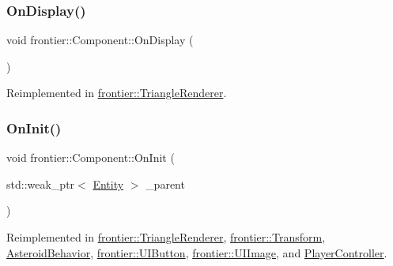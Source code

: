\subsubsection{\texorpdfstring{On\+Display()}{OnDisplay()}}
{\footnotesize\ttfamily void frontier\+::\+Component\+::\+On\+Display (\begin{DoxyParamCaption}{ }\end{DoxyParamCaption})\hspace{0.3cm}{\ttfamily [virtual]}}



Reimplemented in \hyperlink{classfrontier_1_1_triangle_renderer_a2c899b9897b149dd1c7d351c11b53272}{frontier\+::\+Triangle\+Renderer}.

\mbox{\label{classfrontier_1_1_component_af3da02905c4d79219d9b12f260a35ad1}} 
\subsubsection{\texorpdfstring{On\+Init()}{OnInit()}}
{\footnotesize\ttfamily void frontier\+::\+Component\+::\+On\+Init (\begin{DoxyParamCaption}\item[{std\+::weak\+\_\+ptr$<$ \hyperlink{classfrontier_1_1_entity}{Entity} $>$}]{\+\_\+parent }\end{DoxyParamCaption})\hspace{0.3cm}{\ttfamily [virtual]}}



Reimplemented in \hyperlink{classfrontier_1_1_triangle_renderer_af67946b8641608198ae92548b7c002b5}{frontier\+::\+Triangle\+Renderer}, \hyperlink{classfrontier_1_1_transform_a4fef98c5ccbe2bb6303714c7da2ba4ef}{frontier\+::\+Transform}, \hyperlink{class_asteroid_behavior_a79d9559f0d8e109e928acf7f8ff7acea}{Asteroid\+Behavior}, \hyperlink{classfrontier_1_1_u_i_button_a1c4555865094fdd2dd9dd595740c05b0}{frontier\+::\+U\+I\+Button}, \hyperlink{classfrontier_1_1_u_i_image_ad862e7dd5bcd1c2847001f5e1b56c114}{frontier\+::\+U\+I\+Image}, and \hyperlink{class_player_controller_a22c60d9e4464ee585f3592593f14bc50}{Player\+Controller}.

\mbox{\label{classfrontier_1_1_component_ab920f9bc07ce051ebb5559c5a66508d1}} 
